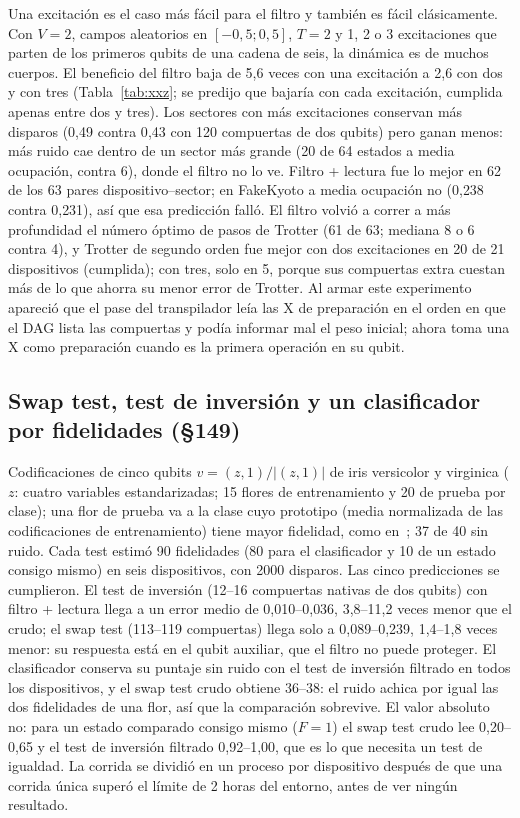 \documentclass[11pt]{article}
\begin{document}
Una excitación es el caso más fácil para el filtro y también es fácil clásicamente. Con $V=2$, campos
aleatorios en $[-0{,}5;0{,}5]$, $T=2$ y 1, 2 o 3 excitaciones que parten de los primeros qubits de una cadena de
seis, la dinámica es de muchos cuerpos. El beneficio del filtro baja de 5{,}6 veces con una excitación a
2{,}6 con dos y con tres (Tabla~\ref{tab:xxz}; se predijo que bajaría con cada excitación, cumplida apenas
entre dos y tres). Los sectores con más excitaciones conservan más disparos (0{,}49 contra 0{,}43 con 120
compuertas de dos qubits) pero ganan menos: más ruido cae dentro de un sector más grande (20 de 64 estados a
media ocupación, contra 6), donde el filtro no lo ve. Filtro + lectura fue lo mejor en 62 de los 63 pares
dispositivo--sector; en FakeKyoto a media ocupación no (0{,}238 contra 0{,}231), así que esa predicción falló.
El filtro volvió a correr a más profundidad el número óptimo de pasos de Trotter (61 de 63; mediana 8 o 6
contra 4), y Trotter de segundo orden fue mejor con dos excitaciones en 20 de 21 dispositivos (cumplida); con
tres, solo en 5, porque sus compuertas extra cuestan más de lo que ahorra su menor error de Trotter. Al armar
este experimento apareció que el pase del transpilador leía las X de preparación en el orden en que el DAG
lista las compuertas y podía informar mal el peso inicial; ahora toma una X como preparación cuando es la
primera operación en su qubit.

\subsection{Swap test, test de inversión y un clasificador por fidelidades (§149)}

Codificaciones de cinco qubits $v=(z,1)/|(z,1)|$ de iris versicolor y virginica ($z$: cuatro variables
estandarizadas; 15 flores de entrenamiento y 20 de prueba por clase); una flor de prueba va a la clase cuyo
prototipo (media normalizada de las codificaciones de entrenamiento) tiene mayor fidelidad, como
en~\cite{blank2020kernel}; 37 de 40 sin ruido. Cada test estimó 90 fidelidades (80 para el clasificador y 10
de un estado consigo mismo) en seis dispositivos, con 2000 disparos. Las cinco predicciones se cumplieron. El
test de inversión (12--16 compuertas nativas de dos qubits) con filtro + lectura llega a un error medio de
0{,}010--0{,}036, 3{,}8--11{,}2 veces menor que el crudo; el swap test (113--119 compuertas) llega solo a
0{,}089--0{,}239, 1{,}4--1{,}8 veces menor: su respuesta está en el qubit auxiliar, que el filtro no puede
proteger. El clasificador conserva su puntaje sin ruido con el test de inversión filtrado en todos los
dispositivos, y el swap test crudo obtiene 36--38: el ruido achica por igual las dos fidelidades de una flor,
así que la comparación sobrevive. El valor absoluto no: para un estado comparado consigo mismo ($F=1$) el
swap test crudo lee 0{,}20--0{,}65 y el test de inversión filtrado 0{,}92--1{,}00, que es lo que necesita un test
de igualdad. La corrida se dividió en un proceso por dispositivo después de que una corrida única superó el
límite de 2 horas del entorno, antes de ver ningún resultado.
\end{document}
